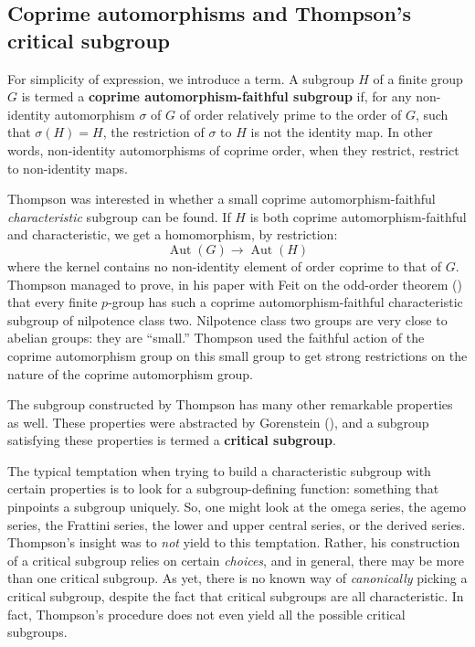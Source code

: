 \documentclass{amsart}
\renewcommand{\definedind}[1]{{\bf #1}}
\begin{document}
\subsection{Coprime automorphisms and Thompson's critical subgroup}

For simplicity of expression, we introduce a term. A subgroup $H$ of a
finite group $G$ is termed a \definedind{coprime automorphism-faithful
  subgroup} if, for any non-identity automorphism $\sigma$ of $G$ of
order relatively prime to the order of $G$, such that $\sigma(H) = H$,
the restriction of $\sigma$ to $H$ is not the identity map. In other
words, non-identity automorphisms of coprime order, when they
restrict, restrict to non-identity maps.

Thompson was interested in whether a small coprime
automorphism-faithful {\em characteristic} subgroup can be found. If
$H$ is both coprime automorphism-faithful and characteristic, we get a
homomorphism, by restriction:
$$\operatorname{Aut}(G) \to \operatorname{Aut}(H)$$
where the kernel contains no non-identity element of order coprime to
that of $G$. Thompson managed to prove, in his paper with Feit on the
odd-order theorem (\cite[Chapter 2, Lemma 8.2, Page
795]{feitthompson}) that every finite $p$-group has such a coprime
automorphism-faithful characteristic subgroup of nilpotence class
two. Nilpotence class two groups are very close to abelian groups:
they are ``small.'' Thompson used the faithful action of the coprime
automorphism group on this small group to get strong restrictions on
the nature of the coprime automorphism group.

The subgroup constructed by Thompson has many other
remarkable properties as well. These properties were abstracted by
Gorenstein (\cite[Theorem 5.3.11, Page 185--186]{gorenstein}), and a
subgroup satisfying these properties is termed a \definedind{critical
  subgroup}.

The typical temptation when trying to build a characteristic subgroup
with certain properties is to look for a subgroup-defining function:
something that pinpoints a subgroup uniquely. So, one might look at
the omega series, the agemo series, the Frattini series, the lower and
upper central series, or the derived series. Thompson's insight was to
{\em not} yield to this temptation. Rather, his construction of a
critical subgroup relies on certain {\em choices}, and in general, there
may be more than one critical subgroup. As yet, there is no known way
of {\em canonically} picking a critical subgroup, despite the fact
that critical subgroups are all characteristic. In fact, Thompson's
procedure does not even yield all the possible critical subgroups.
\end{document}

